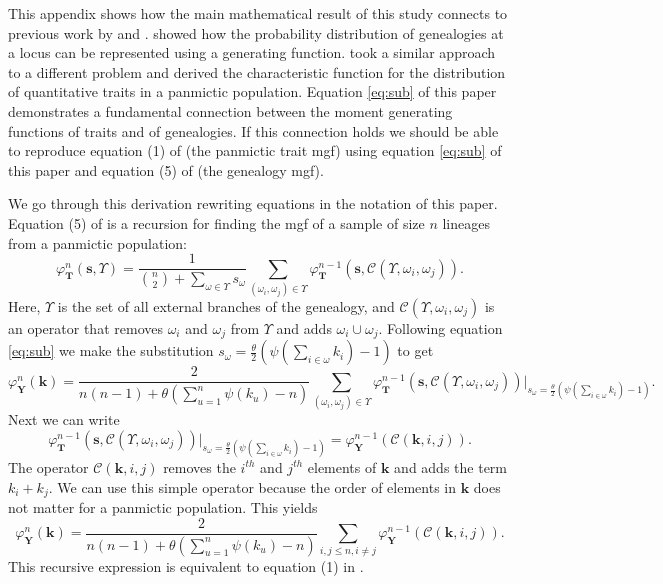 This appendix shows how the main mathematical result of this study connects to
previous work by \citet{Lohse2011} and \citet{Schraiber2015}. \citet{Lohse2011}
showed how the probability distribution of genealogies at a locus can be
represented using a generating function. \citet{Schraiber2015} took a similar
approach to a different problem and derived the characteristic function for the
distribution of quantitative traits in a panmictic population.
Equation \eqref{eq:sub} of this paper demonstrates a fundamental connection
between the moment generating functions of traits and of genealogies. If this
connection holds we should be able to reproduce equation (1)
of \citet{Schraiber2015} (the panmictic trait mgf) using equation
\eqref{eq:sub} of this paper and equation (5) of \citet{Lohse2011} (the genealogy mgf).

We go through this derivation rewriting equations in the notation of this paper.
Equation (5) of \citet{Lohse2011} is a recursion for finding the mgf of a sample
of size $n$ lineages from a panmictic population:
\begin{equation}
  \varphi^n_{\mathbf{T}}(\mathbf{s}, \Upsilon)=
  \frac{1}{{n\choose 2}+\sum_{\omega \in \Upsilon}s_\omega}
  \sum_{(\omega_i, \omega_j) \in \Upsilon}\varphi^{n-1}_{\mathbf{T}}
  (\mathbf{s}, \mathcal{C}(\Upsilon, \omega_i, \omega_j)).
\end{equation}
Here, $\Upsilon$ is the set of all external branches of the genealogy, and
$\mathcal{C}(\Upsilon,\omega_i,\omega_j)$ is an operator that removes $\omega_i$
and $\omega_j$ from $\Upsilon$ and adds $\omega_i \cup \omega_j$. Following
equation \eqref{eq:sub} we make the substitution $s_{\omega}=\frac{\theta}{2}
\left( \psi\left(\sum_{i \in \omega}k_{i}\right) -1 \right)$ to get
\begin{equation}
  \varphi^n_{\mathbf{Y}}(\mathbf{k}) =
  \frac{2}{n(n-1) + \theta(\sum_{u=1}^n \psi(k_u)-n)}
  \sum_{(\omega_i, \omega_j) \in \Upsilon}\varphi^{n-1}_{\mathbf{T}}
  (\mathbf{s}, \mathcal{C}(\Upsilon, \omega_i, \omega_j))
  \Bigr|_{s_{\omega}=\frac{\theta}{2} \left( \psi\left(\sum_{i \in \omega}k_{i}\right) -1 \right)}.
\end{equation}
Next we can write
\begin{equation}
\varphi^{n-1}_{\mathbf{T}}
  (\mathbf{s}, \mathcal{C}(\Upsilon, \omega_i, \omega_j))
\Bigr|_{s_{\omega}=\frac{\theta}{2} \left( \psi\left(\sum_{i \in \omega}k_{i}\right) -1 \right)} =
\varphi^{n-1}_{\mathbf{Y}}(\mathscr{C}(\mathbf{k},i,j)).
\end{equation}
The operator $\mathscr{C}(\mathbf{k},i,j)$ removes the $i^{th}$ and $j^{th}$
elements of $\mathbf{k}$ and adds the term $k_i+k_j$. We can use this simple
operator because the order of elements in $\mathbf{k}$ does not matter for a
panmictic population. This yields
\begin{equation}
  \label{eq:schraiber}
  \varphi^n_{\mathbf{Y}}(\mathbf{k}) =
  \frac{2}{n(n-1) + \theta(\sum_{u=1}^n \psi(k_u)-n)}
  \sum_{i, j\leq n, i \neq j} \varphi^{n-1}_{\mathbf{Y}}(\mathscr{C}(\mathbf{k},i,j)).
\end{equation}
This recursive expression is equivalent to equation (1) in \citet{Schraiber2015}. 

